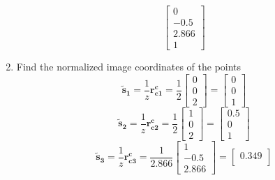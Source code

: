 \documentclass[12pt, letterpaper]{article}
\begin{document}
\begin{enumerate}
\begin{equation*}
                \begin{bmatrix}
                    0\\
                    -0.5\\
                    2.866\\
                    1
                \end{bmatrix}
        \end{equation*}
    \item Find the normalized image coordinates of the points
        \begin{equation*}
            \bm{\tilde{s}_1}=\frac{1}{z}\bm{{r}^c_{c1}}=
            \frac{1}{2}
            \begin{bmatrix}
                0\\
                0\\
                2
            \end{bmatrix}=
            \begin{bmatrix}
                0\\
                0\\
                1
            \end{bmatrix}
        \end{equation*}
        \begin{equation*}
            \bm{\tilde{s}_2}=\frac{1}{z}\bm{{r}^c_{c2}}=
            \frac{1}{2}
            \begin{bmatrix}
                1\\
                0\\
                2
            \end{bmatrix}=
            \begin{bmatrix}
                0.5\\
                0\\
                1
            \end{bmatrix}
        \end{equation*}
        \begin{equation*}
            \bm{\tilde{s}_3}=\frac{1}{z}\bm{{r}^c_{c3}}=
            \frac{1}{2.866}
            \begin{bmatrix}
                1\\
                -0.5\\
                2.866
            \end{bmatrix}=
            \begin{bmatrix}
                0.349\\

\end{bmatrix}
\end{equation*}
\end{enumerate}
\end{document}

